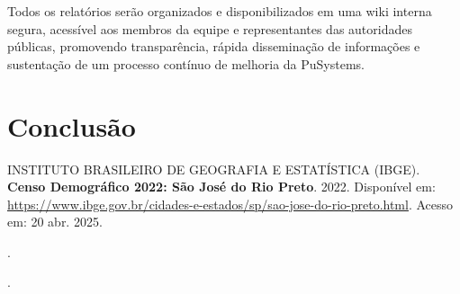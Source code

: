 \documentclass[a5paper, 12pt]{article}
\begin{document}
Todos os relatórios serão organizados e disponibilizados em uma wiki interna segura, acessível aos membros da equipe e representantes das autoridades públicas, promovendo transparência, rápida disseminação de informações e sustentação de um processo contínuo de melhoria da PuSystems.

\newpage
\section{Conclusão}

\newpage
\renewcommand{\refname}{Bibliografia}
\begin{thebibliography}{09}
 INSTITUTO BRASILEIRO DE GEOGRAFIA E ESTATÍSTICA (IBGE). 
\textbf{Censo Demográfico 2022: São José do Rio Preto}. 
2022. 
Disponível em: \url{https://www.ibge.gov.br/cidades-e-estados/sp/sao-jose-do-rio-preto.html}. 
Acesso em: 20 abr. 2025.

\bibitem{} %
\textbf{}. %

\bibitem{} %
\textbf{}. %

\end{thebibliography}
\end{document}

